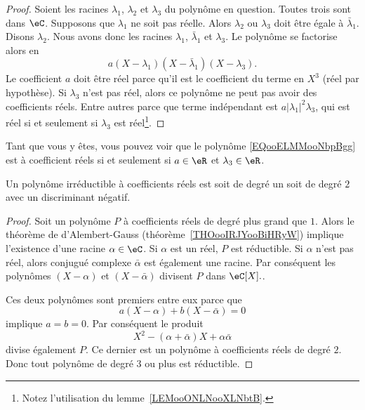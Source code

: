 \begin{proof}
    Soient les racines \( \lambda_1\), \( \lambda_2\) et \( \lambda_3\) du polynôme en question. Toutes trois sont dans \( \eC\). Supposons que \( \lambda_1\) ne soit pas réelle. Alors \( \lambda_2\) ou \( \lambda_3\) doit être égale à \( \bar\lambda_1\). Disons \( \lambda_2\). Nous avons donc les racines \( \lambda_1\), \( \bar\lambda_1\) et \( \lambda_3\). Le polynôme se factorise alors en
    \begin{equation}        \label{EQooELMMooNbpBgg}
        a(X-\lambda_1)(X-\bar\lambda_1)(X-\lambda_3).
    \end{equation}
    Le coefficient \( a\) doit être réel parce qu'il est le coefficient du terme en \( X^3\) (réel par hypothèse). Si \( \lambda_3\) n'est pas réel, alors ce polynôme ne peut pas avoir des coefficients réels. Entre autres parce que terme indépendant est \( a| \lambda_1 |^2\lambda_3\), qui est réel si et seulement si \( \lambda_3\) est réel\footnote{Notez l'utilisation du lemme~\ref{LEMooONLNooXLNbtB}.}.
\end{proof}
Tant que vous y êtes, vous pouvez voir que le polynôme \eqref{EQooELMMooNbpBgg} est à coefficient réels si et seulement si \( a\in \eR\) et \( \lambda_3\in \eR\).

\begin{proposition}
    Un polynôme irréductible à coefficients réels est soit de degré un soit de degré \( 2\) avec un discriminant négatif.
\end{proposition}

\begin{proof}
    Soit un polynôme \( P\) à coefficients réels de degré plus grand que \( 1\). Alors le théorème de d'Alembert-Gauss (théorème~\ref{THOooIRJYooBiHRyW}) implique l'existence d'une racine \( \alpha \in \eC \). Si $\alpha$ est un réel, $P$ est réductible. Si \( \alpha\) n'est pas réel, alors conjugué complexe \( \bar \alpha\) est également une racine. Par conséquent les polynômes \( (X-\alpha)\) et \( (X-\bar \alpha)\) divisent \( P\) dans \( \eC[X]. \).

    Ces deux polynômes sont premiers entre eux parce que
    \begin{equation}
        a(X-\alpha)+b(X-\bar \alpha)=0
    \end{equation}
    implique \( a=b=0\). Par conséquent le produit
    \begin{equation}
        X^2-(\alpha+\bar \alpha)X+\alpha\bar\alpha
    \end{equation}
    divise également \( P\). Ce dernier est un polynôme à coefficients réels de degré \( 2\). Donc tout polynôme de degré \( 3\) ou plus est réductible.
\end{proof}

